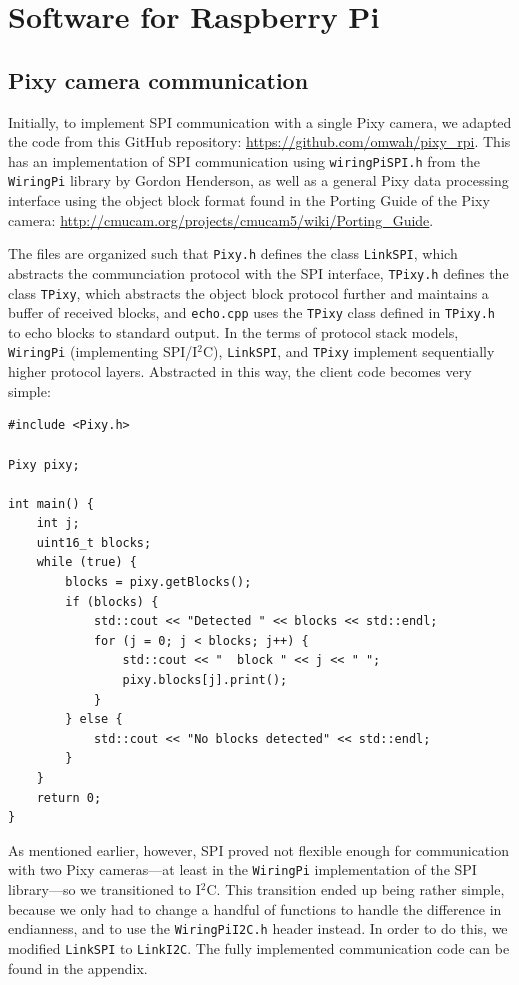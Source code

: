 \documentclass[letterpaper, 11pt]{article}
\newcommand{\iic}{I$^2$C\xspace}
\begin{document}
\section{Software for Raspberry Pi}
\subsection{Pixy camera communication}
Initially, to implement SPI communication with a single Pixy camera, we adapted the code from this GitHub repository: \url{https://github.com/omwah/pixy_rpi}. This has an implementation of SPI communication using \verb|wiringPiSPI.h| from the \verb|WiringPi| library by Gordon Henderson, as well as a general Pixy data processing interface using the object block format found in the Porting Guide of the Pixy camera: \url{http://cmucam.org/projects/cmucam5/wiki/Porting_Guide}.

The files are organized such that \verb|Pixy.h| defines the class \verb|LinkSPI|, which abstracts the communciation protocol with the SPI interface, \verb|TPixy.h| defines the class \verb|TPixy|, which abstracts the object block protocol further and maintains a buffer of received blocks, and \verb|echo.cpp| uses the \texttt{TPixy} class defined in \texttt{TPixy.h} to echo blocks to standard output. In the terms of protocol stack models, \verb|WiringPi| (implementing SPI/\iic), \verb|LinkSPI|, and \verb|TPixy| implement sequentially higher protocol layers. Abstracted in this way, the client code becomes very simple:

\begin{verbatim}
#include <Pixy.h>

Pixy pixy;

int main() {
    int j;
    uint16_t blocks;
    while (true) {
        blocks = pixy.getBlocks();
        if (blocks) {
            std::cout << "Detected " << blocks << std::endl;
            for (j = 0; j < blocks; j++) {
                std::cout << "  block " << j << " ";
                pixy.blocks[j].print();
            }
        } else {
            std::cout << "No blocks detected" << std::endl;
        }
    }
    return 0;
}
\end{verbatim}

As mentioned earlier, however, SPI proved not flexible enough for communication with two Pixy cameras---at least in the \texttt{WiringPi} implementation of the SPI library---so we transitioned to \iic. This transition ended up being rather simple, because we only had to change a handful of functions to handle the difference in endianness, and to use the \verb|WiringPiI2C.h| header instead. In order to do this, we modified \verb|LinkSPI| to \verb|LinkI2C|. The fully implemented communication code can be found in the appendix.
\end{document}

